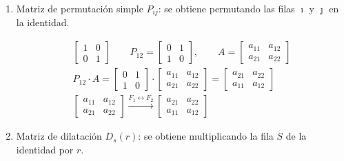 \begin{enumerate}[label=\color{lightblue}\arabic*)]
	\item Matriz de permutación simple $P_{ij}$: se obtiene permutando las filas $\imath$ y $\jmath$ en la identidad.
	
	\Ej 
	\[ \begin{array}{l}
		\begin{bmatrix}
			1 & 0\\
			0 & 1
		\end{bmatrix}\qquad P_{12}=\begin{bmatrix}
		0 & 1\\
		1 & 0
		\end{bmatrix},\qquad A=\begin{bmatrix}
		a_{11} & a_{12}\\
		a_{21} & a_{22}
		\end{bmatrix}\\
		P_{12}\cdot A=\begin{bmatrix}
			0 & 1\\
			1 & 0
		\end{bmatrix}\cdot\begin{bmatrix}
		a_{11} & a_{12}\\
		a_{21} & a_{22}
		\end{bmatrix}=\begin{bmatrix}
		a_{21} & a_{22}\\
		a_{11} & a_{12}
		\end{bmatrix}\\
		\begin{bmatrix}
			a_{11} & a_{12}\\
			a_{21} & a_{22}
		\end{bmatrix}\xrightarrow{F_1\longleftrightarrow F_2}\begin{bmatrix}
		a_{21} & a_{22}\\
		a_{11} & a_{12}
		\end{bmatrix}
	\end{array} \]
	\item Matriz de dilatación $D_s(r)$: se obtiene multiplicando la fila $S$ de la identidad por $r$.
	
	\Ej
	

\end{enumerate}

